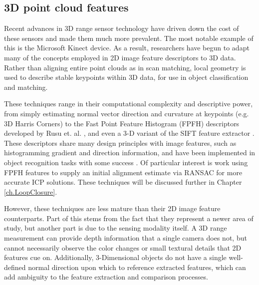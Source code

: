 \subsection{3D point cloud features}

Recent advances in 3D range sensor technology have driven down the cost of these sensors and made them much more prevalent. The most notable example of this is the Microsoft Kinect device. As a result, researchers have begun to adapt many of the concepts employed in 2D image feature descriptors to 3D data. Rather than aligning entire point clouds as in scan matching, local geometry is used to describe stable keypoints within 3D data, for use in object classification and matching. 

These techniques range in their computational complexity and descriptive power, from simply estimating normal vector direction and curvature at keypoints (e.g. 3D Harris Corners) to the Fast Point Feature Histogram (FPFH) descriptors developed by Rusu et. al. \cite{Rusu2009}, and even a 3-D variant of the SIFT feature extractor \cite{Scovanner2007}. These descriptors share many design principles with image features, such as histogramming gradient and direction information, and have been implemented in object recognition tasks with some success \cite{Rusu2009}. Of particular interest is work using FPFH features to supply an initial alignment estimate via RANSAC for more accurate ICP solutions. These techniques will be discussed further in Chapter \ref{ch.LoopClosure}.

However, these techniques are less mature than their 2D image feature counterparts. Part of this stems from the fact that they represent a newer area of study, but another part is due to the sensing modality itself. A 3D range measurement  can provide depth information that a single camera does not, but cannot necessarily observe the color changes or small textural details that 2D features cue on. Additionally, 3-Dimensional objects do not have a single well-defined normal direction upon which to reference extracted features, which can add ambiguity to the feature extraction and comparison processes. 

